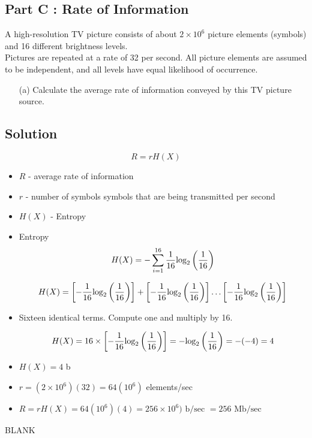 \documentclass[a4paper,12pt]{article}
\begin{document}
\Large 
\subsection*{Part C : Rate of Information}
A high-resolution TV picture consists of about $2 \times 10^6$ picture elements (symbols) and 16
different brightness levels.\\
\newline
Pictures are repeated at a rate of 32 per second. All picture elements
are assumed to be independent, and all levels have equal likelihood of occurrence. 
\begin{itemize}
\item[(a)]Calculate the
average rate of information conveyed by this TV picture source.
\end{itemize}


\subsection*{Solution}


\begin{framed}
\[R = rH(X)\] 

\begin{itemize}
    \item $R$  - average rate of information
    \item $r$ - number of symbols symbols that are being transmitted per second
    \item $H(X)$ - Entropy
\end{itemize}
\end{framed}


\begin{itemize}

\item Entropy \[H(X) = - \sum \limits^{16}_{i=1} {1\over 16} \mbox{log}_2 \left( {1\over 16} \right)\] \bigskip

\[H(X) = \left[ -{1\over 16} \mbox{log}_2 \left({ 1\over 16}  \right)\right] + \left[- {1\over 16} \mbox{log}_2 \left({ 1\over 16}  \right)\right] \ldots\left[ -{1\over 16} \mbox{log}_2 \left({ 1\over 16}  \right)\right] \] \bigskip
\item Sixteen identical terms. Compute one and multiply by 16.

\[ H(X) = 16 \times \left[ -{1\over 16} \mbox{log}_2 \left({ 1\over 16}  \right)\right]  = -\mbox{log}_2 \left({ 1\over 16}  \right)= -(-4) = 4\] \bigskip
\item $H(X)= 4$ b
\item $r =  (2 \times 10^6)(32) = 64(10^6)$ elements/sec \bigskip

\item $R = rH(X) = 64(10^6)(4) = 256 \times 10^6) \mbox{ b/sec } = 256 \mbox{ Mb/sec }$ \bigskip
\end{itemize}

\newpage 

BLANK
\end{document}
